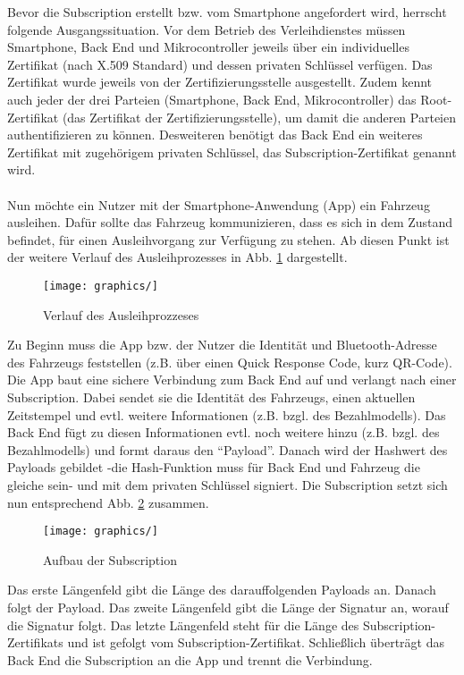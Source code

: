 Bevor die Subscription erstellt bzw. vom Smartphone angefordert wird, herrscht folgende Ausgangssituation. Vor dem Betrieb des Verleihdienstes müssen Smartphone, Back End und Mikrocontroller jeweils über ein individuelles Zertifikat (nach X.509 Standard) und dessen privaten Schlüssel verfügen. Das Zertifikat wurde jeweils von der Zertifizierungsstelle ausgestellt. Zudem kennt auch jeder der drei Parteien (Smartphone, Back End, Mikrocontroller) das Root-Zertifikat (das Zertifikat der Zertifizierungsstelle), um damit die anderen Parteien authentifizieren zu können. Desweiteren benötigt das Back End ein weiteres Zertifikat mit zugehörigem privaten Schlüssel, das Subscription-Zertifikat genannt wird.
\\\\
Nun möchte ein Nutzer mit der Smartphone-Anwendung (App) ein Fahrzeug ausleihen. Dafür sollte das Fahrzeug kommunizieren, dass es sich in dem Zustand befindet, für einen Ausleihvorgang zur Verfügung zu stehen. Ab diesen Punkt ist der weitere Verlauf des Ausleihprozesses in Abb. \ref{fig: verlauf ausleihprozess} dargestellt.
\begin{figure}
    \centering
    \texttt{[image: graphics/]}
    \caption[Verlauf des Ausleihprozzeses]{Verlauf des Ausleihprozzeses}
    \label{fig: verlauf ausleihprozess}
\end{figure}
Zu Beginn muss die App bzw. der Nutzer die Identität und Bluetooth-Adresse des Fahrzeugs feststellen (z.B. über einen Quick Response Code, kurz QR-Code). Die App baut eine sichere Verbindung zum Back End auf und verlangt nach einer Subscription. Dabei sendet sie die Identität des Fahrzeugs, einen aktuellen Zeitstempel und evtl. weitere Informationen (z.B. bzgl. des Bezahlmodells). Das Back End fügt zu diesen Informationen evtl. noch weitere hinzu (z.B. bzgl. des Bezahlmodells) und formt daraus den "`Payload"'. Danach wird der Hashwert des Payloads gebildet -die Hash-Funktion muss für Back End und Fahrzeug die gleiche sein- und mit dem privaten Schlüssel signiert. Die Subscription setzt sich nun entsprechend Abb. \ref{fig: aufbau subscription} zusammen.
\begin{figure}
    \centering
    \texttt{[image: graphics/]}
    \caption[Aufbau der Subscription]{Aufbau der Subscription}
    \label{fig: aufbau subscription}
\end{figure}
Das erste Längenfeld gibt die Länge des darauffolgenden Payloads an. Danach folgt der Payload. Das zweite Längenfeld gibt die Länge der Signatur an, worauf die Signatur folgt. Das letzte Längenfeld steht für die Länge des Subscription-Zertifikats und ist gefolgt vom Subscription-Zertifikat. Schließlich überträgt das Back End die Subscription an die App und trennt die Verbindung.
